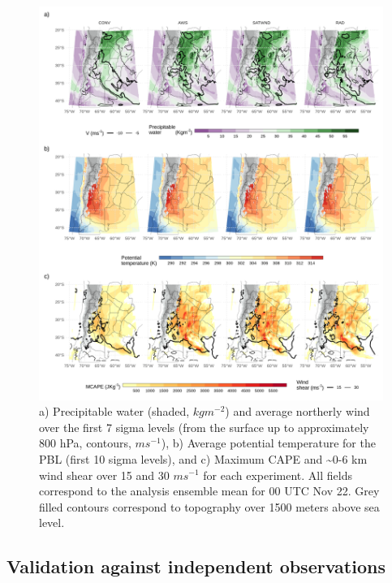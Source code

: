 \documentclass[authoryear,preprint,review,12pt]{elsarticle} %
\begin{document}
\begin{figure}
\includegraphics[width=1\linewidth]{../figures/summary-fields-1} \caption{a) Precipitable water (shaded, \(kgm^{-2}\)) and average northerly wind over the first 7 sigma levels (from the surface up to approximately 800 hPa, contours, \(ms^{-1}\)), b) Average potential temperature for the PBL (first 10 sigma levels), and c) Maximum CAPE and \textasciitilde0-6 km wind shear over 15 and 30 \(ms^{-1}\) for each experiment. All fields correspond to the analysis ensemble mean for 00 UTC Nov 22. Grey filled contours correspond to topography over 1500 meters above sea level.}\label{fig:summary-fields}
\end{figure}

\hypertarget{validation-against-independent-observations}{%
\subsection{Validation against independent observations}\label{validation-against-independent-observations}}
\end{document}
